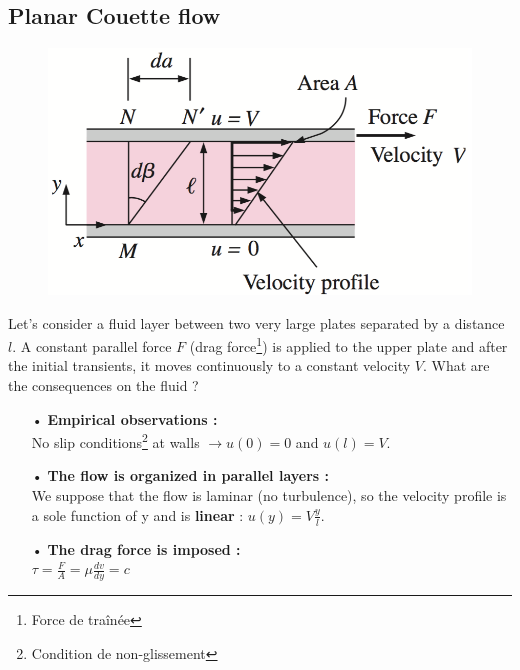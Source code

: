 \subsection{Planar Couette flow}
\begin{figure}
	\vspace{-5mm}
	\includegraphics[scale=0.4]{ch1/6}
\end{figure}
Let's consider a fluid layer between two very large plates separated by a distance $l$. A constant parallel force $F$ (drag force\footnote{Force de traînée}) is applied to the upper plate and after the initial transients, it moves continuously to a constant velocity $V$. What are the consequences on the fluid ? \\
	
\begin{itemize}
	\item[•] \textbf{Empirical observations : }\\
	      No slip conditions\footnote{Condition de non-glissement} at walls $\rightarrow u(0) = 0$ and $u(l) = V$. \\
	\item[•] \textbf{The flow is organized in parallel layers :}\\
	      We suppose that the flow is laminar (no turbulence), so the velocity profile is a sole function of y and is \textbf{linear} : $u(y) = V\frac{y}{l}$.\\
	\item[•] \textbf{The drag force is imposed :} \\
	      $\tau = \frac{F}{A} = \mu \frac{dv}{dy} = c$
\end{itemize}
	
\newpage
	
